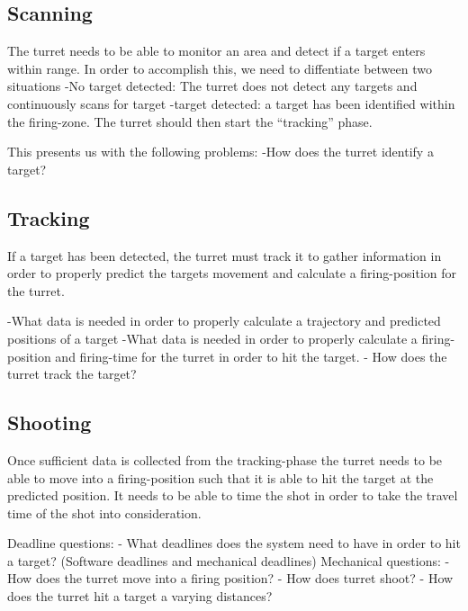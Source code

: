 \subsection{Scanning}
The turret needs to be able to monitor an area and detect if a target enters
within range. In order to accomplish this, we need to diffentiate between two
situations 
-No target detected: The turret does not detect any targets and continuously
scans for target 
-target detected: a target has been identified within the firing-zone. The
turret should then start the ``tracking'' phase.

This presents us with the following problems:
-How does the turret identify a target?

% 
% 
\subsection{Tracking}
If a target has been detected, the turret must track it to gather
information in order to properly predict the targets movement and calculate a
firing-position for the turret.

 -What data is needed in order to properly
calculate a trajectory and predicted positions of a target
-What data is needed in order to properly calculate a firing-position and
firing-time for the turret in order to hit the target.
- How does the turret track the target?

\subsection{Shooting}
Once sufficient data is collected from the tracking-phase the turret needs to be
able to move into a firing-position such that it is able to hit the target at
the predicted position. It needs to be able to time the shot in order to take
the travel time of the shot into consideration.

Deadline questions:
- What deadlines does the system need to have in order to hit a target?
(Software deadlines and mechanical deadlines)
Mechanical questions:
- How does the turret move into a firing position?
- How does turret shoot?
- How does the turret hit a target a varying distances?


